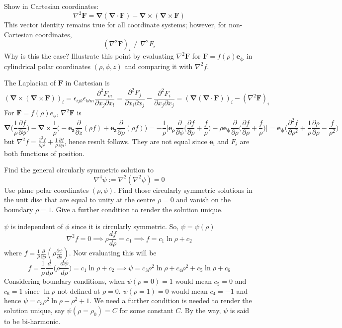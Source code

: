 \documentclass[a4paper]{article}
\begin{document}
\begin{qns}
Show in Cartesian coordinates:
$$\nabla^2\mathbf{F}=\boldsymbol{\nabla}(\boldsymbol{\nabla}\cdot\mathbf{F})-\boldsymbol{\nabla}\times(\boldsymbol{\nabla}\times\mathbf{F})$$
This vector identity remains true for all coordinate systems; however, for non-Cartesian coordinates,
$$(\nabla^2\mathbf{F})_i\neq\nabla^2F_i$$
Why is this the case? Illustrate this point by evaluating $\nabla^2\mathbf{F}$ for $\mathbf{F}=f(\rho)\boldsymbol{e_\phi}$ in cylindrical polar coordinates $(\rho,\phi,z)$ and comparing it with $\nabla^2f$.
\end{qns}
\begin{ans} The Laplacian of $\mathbf{F}$ in Cartesian is
$$(\boldsymbol{\nabla}\times(\boldsymbol{\nabla}\times\mathbf{F}))_i=\epsilon_{ijk}\epsilon_{klm}\frac{\partial^2F_m}{\partial x_j\partial x_l}=\frac{\partial^2F_j}{\partial x_i\partial x_j}-\frac{\partial^2F_i}{\partial x_j\partial x_j}=(\boldsymbol{\nabla}(\boldsymbol{\nabla}\cdot\mathbf{F}))_i-(\nabla^2\mathbf{F})_i$$
For $\mathbf{F}=f(\rho)e_\phi$, $\nabla^2\mathbf{F}$ is
$$\boldsymbol{\nabla}\bigg(\frac{1}{\rho}\frac{\partial f}{\partial\phi}\bigg)-\boldsymbol{\nabla}\times\frac{1}{\rho}\bigg(-\mathbf{e_z}\frac{\partial}{\partial z}(\rho f)+\mathbf{e_z}\frac{\partial}{\partial\rho}(\rho f)\bigg)=-\frac{1}{\rho}\bigg[\boldsymbol{e_\rho}\frac{\partial}{\partial\phi}\bigg(\frac{\partial f}{\partial\rho}+\frac{f}{\rho}\bigg)-\rho \boldsymbol{e_\phi}\frac{\partial}{\partial\rho}\bigg(\frac{\partial f}{\partial\rho}+\frac{f}{\rho}\bigg)\bigg]=\boldsymbol{e_\phi}\bigg(\frac{\partial^2f}{\partial\rho^2}+\frac{1}{\rho}\frac{\partial\rho}{\partial\rho}-\frac{f}{\rho^2}\bigg)$$
but $\nabla^2f=\frac{\partial^2f}{\partial\rho^2}+\frac{1}{\rho}\frac{\partial f}{\partial\rho}$, hence result follows. They are not equal since $\mathbf{e_i}$ and $F_i$ are both functions of position.
\end{ans}
\begin{qns}[Biharmonic]
Find the general circularly symmetric solution to
$$\nabla^4\psi:=\nabla^2(\nabla^2\psi)=0$$
Use plane polar coordinates $(\rho,\phi)$. Find those circularly symmetric solutions in the unit disc that are equal to unity at the centre $\rho=0$ and vanish on the boundary $\rho=1$. Give a further condition to render the solution unique.
\end{qns}
\begin{ans}
$\psi$ is independent of $\phi$ since it is circularly symmetric. So, $\psi=\psi(\rho)$
$$\nabla^2f=0\implies \rho\frac{d f}{d\rho}=c_1\implies f=c_1\ln\rho+c_2$$
where $f=\frac{1}{\rho}\frac{\partial}{\partial\rho}(\rho\frac{\partial\psi}{\partial\rho})$. Now evaluating this will be
$$f=\frac{1}{\rho}\frac{d}{d\rho}\bigg(\rho\frac{d\psi}{d\rho}\bigg)=c_1\ln\rho+c_2\implies \psi=c_3\rho^2\ln\rho+c_4\rho^2+c_5\ln\rho+c_6$$
Considering boundary conditions, when $\psi(\rho=0)=1$ would mean $c_5=0$ and $c_6=1$ since $\ln\rho$ not defined at $\rho=0$. $\psi(\rho=1)=0$ would mean $c_4=-1$ and hence $\psi=c_3\rho^2\ln\rho-\rho^2+1$. We need a further condition is needed to render the solution unique, say $\psi(\rho=\rho_0)=C$ for some constant $C$. By the way, $\psi$ is said to be bi-harmonic.
\end{ans}
\end{document}
